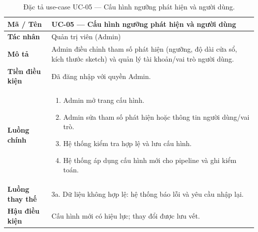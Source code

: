 \begin{table}[H]
  \centering
  \caption{Đặc tả use-case UC-05 --- Cấu hình ngưỡng phát hiện và người dùng.}
  \label{tab:uc05}
  \small
  \begin{tabularx}{\linewidth}{@{}>{\bfseries}l X@{}}
    \toprule
    Mã / Tên & UC-05 --- Cấu hình ngưỡng phát hiện và người dùng \\
    \midrule
    Tác nhân & Quản trị viên (Admin) \\
    Mô tả & Admin điều chỉnh tham số phát hiện (ngưỡng, độ dài cửa sổ, kích thước sketch) và quản lý tài khoản/vai trò người dùng. \\
    Tiền điều kiện & Đã đăng nhập với quyền Admin. \\
    Luồng chính &
      \begin{enumerate}[nosep,leftmargin=*]
        \item Admin mở trang cấu hình.
        \item Admin sửa tham số phát hiện hoặc thông tin người dùng/vai trò.
        \item Hệ thống kiểm tra hợp lệ và lưu cấu hình.
        \item Hệ thống áp dụng cấu hình mới cho pipeline và ghi kiểm toán.
      \end{enumerate} \\
    Luồng thay thế & 3a. Dữ liệu không hợp lệ: hệ thống báo lỗi và yêu cầu nhập lại. \\
    Hậu điều kiện & Cấu hình mới có hiệu lực; thay đổi được lưu vết. \\
    \bottomrule
  \end{tabularx}
\end{table}


